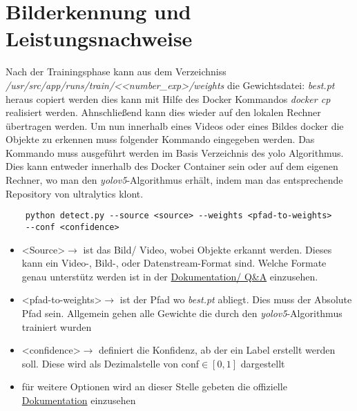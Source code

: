 \chapter{Bilderkennung und Leistungsnachweise}
Nach der Trainingsphase kann aus dem Verzeichniss \textit{/usr/src/app/runs/train/<\textless number\_exp\textgreater/weights} die Gewichtsdatei: \textit{best.pt} heraus copiert werden dies kann mit Hilfe des Docker Kommandos \textit{docker cp} realisiert werden. Ahnschließend kann dies wieder auf den lokalen Rechner übertragen werden. Um nun innerhalb eines Videos oder eines Bildes docker die Objekte zu erkennen muss folgender Kommando eingegeben werden. Das Kommando muss ausgeführt werden im Basis Verzeichnis des \ac{yolo} Algorithmus. Dies kann entweder innerhalb des Docker Container sein oder auf dem eigenen Rechner, wo man den \textit{\ac{yolo}v5}-Algorithmus erhält, indem man das entsprechende Repository von ultralytics klont.

\begin{verbatim}
    python detect.py --source <source> --weights <pfad-to-weights> 
    --conf <confidence>
\end{verbatim}

\begin{itemize}
    \item \textless Source\textgreater $\rightarrow$ ist das Bild/ Video, wobei Objekte erkannt werden. Dieses kann ein Video-, Bild-, oder Datenstream-Format sind. Welche Formate genau unterstütz werden ist in der \href{https://github.com/ultralytics/yolov5/issues/6855}{Dokumentation/ Q\&A} einzusehen.
    \item \textless pfad-to-weights\textgreater $\rightarrow$ ist der Pfad wo \textit{best.pt} abliegt. Dies muss der Absolute Pfad sein. Allgemein gehen alle Gewichte die durch den \textit{\ac{yolo}v5}-Algorithmus trainiert wurden
    \item \textless confidence\textgreater  $\rightarrow$ definiert die Konfidenz, ab der ein Label erstellt werden soll. Diese wird als Dezimalstelle von conf$\in [0,1]$ dargestellt
    \item für weitere Optionen wird an dieser Stelle gebeten die offizielle \href{https://github.com/ultralytics/yolov5/blob/master/detect.py}{Dokumentation} einzusehen
\end{itemize}